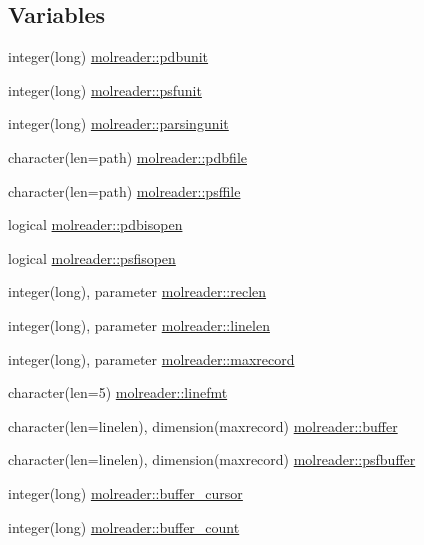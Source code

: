 \subsection*{Variables}
\begin{DoxyCompactItemize}
\item 
integer(long) \hyperlink{namespacemolreader_a5b0570862e5318937ea68a01966ed56f}{molreader\+::pdbunit}
\item 
integer(long) \hyperlink{namespacemolreader_a2b57a032db6161c98961f5e8109c3b90}{molreader\+::psfunit}
\item 
integer(long) \hyperlink{namespacemolreader_ac41219b2f68591f315dded4488483263}{molreader\+::parsingunit}
\item 
character(len=path) \hyperlink{namespacemolreader_aa372f060e4e581b1c14e2b46a65d2df4}{molreader\+::pdbfile}
\item 
character(len=path) \hyperlink{namespacemolreader_a48ac5c969e35417342bb66a57adec842}{molreader\+::psffile}
\item 
logical \hyperlink{namespacemolreader_ad7636360c8e0ecb526000567dd32d2d0}{molreader\+::pdbisopen}
\item 
logical \hyperlink{namespacemolreader_ae5cd9063d12a39b0e8266e184439c808}{molreader\+::psfisopen}
\item 
integer(long), parameter \hyperlink{namespacemolreader_a8f12be3272b946fd698c9fbaf2ba9d32}{molreader\+::reclen}
\item 
integer(long), parameter \hyperlink{namespacemolreader_acd493d996a1fcd0ed77937e925c9b7fe}{molreader\+::linelen}
\item 
integer(long), parameter \hyperlink{namespacemolreader_a7192fdfba4bcb0ee7504a9c6695c7106}{molreader\+::maxrecord}
\item 
character(len=5) \hyperlink{namespacemolreader_ac14650c697f68fd15530b93807e3f42f}{molreader\+::linefmt}
\item 
character(len=linelen), dimension(maxrecord) \hyperlink{namespacemolreader_a06d78b69405420664607fb01b4d8e97a}{molreader\+::buffer}
\item 
character(len=linelen), dimension(maxrecord) \hyperlink{namespacemolreader_aab845daa54f6803a37ceb91d7ad296a7}{molreader\+::psfbuffer}
\item 
integer(long) \hyperlink{namespacemolreader_a7b2e4f11efe55d80469efa3f7aeacbab}{molreader\+::buffer\+\_\+cursor}
\item 
integer(long) \hyperlink{namespacemolreader_ac7969154d301aab4a51cde89ec2f08ee}{molreader\+::buffer\+\_\+count}

\end{DoxyCompactItemize}
